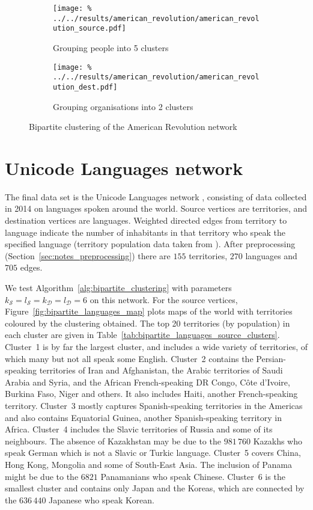 \documentclass[12pt]{ociamthesis}
\theoremstyle{plain}
\theoremstyle{definition}
\theoremstyle{remark}
\newcommand\ca[1]{\mathcal{#1}}
\begin{document}
\begin{figure}[H]
  \begin{subfigure}{.49\textwidth}
    \centering
    \texttt{[image: \%
    ../../results/american\_revolution/american\_revolution\_source.pdf]}
    \caption{Grouping people into 5 clusters}
    \label{fig:bipartite_revolution_source}
  \end{subfigure}
  \begin{subfigure}{.49\textwidth}
    \centering
    \texttt{[image: \%
    ../../results/american\_revolution/american\_revolution\_dest.pdf]}
    \caption{Grouping organisations into 2 clusters}
    \label{fig:bipartite_revolution_dest}
  \end{subfigure}
  \caption{Bipartite clustering of the American Revolution network}
  \label{fig:bipartite_revolution}
\end{figure}

\section{Unicode Languages network} \label{sec:bipartite_languages}

The final data set is the Unicode Languages network \cite{konect:unicodelang},
consisting of data collected in 2014 on languages spoken around the world.
Source vertices are territories, and destination vertices are languages.
Weighted directed edges from territory to language indicate the number of
inhabitants in that territory who speak the specified language (territory
population data taken from \cite{geonames}).
After preprocessing (Section~\ref{sec:notes_preprocessing}) there are $155$
territories, $270$ languages and $705$ edges.

We test Algorithm~\ref{alg:bipartite_clustering} with parameters $k_\ca{S} =
l_\ca{S} = k_\ca{D} = l_\ca{D} = 6$ on this network.
For the source vertices, Figure~\ref{fig:bipartite_languages_map} plots maps of
the world with territories coloured by the clustering obtained. The top 20
territories (by population) in each cluster are given in
Table~\ref{tab:bipartite_languages_source_clusters}.
Cluster~1 is by far the largest cluster, and includes a wide variety of
territories, of which many but not all speak some English.
Cluster~2 contains the Persian-speaking territories of Iran and Afghanistan,
the Arabic territories of Saudi Arabia and Syria, and the African
French-speaking DR Congo, C\^ote d'Ivoire, Burkina Faso, Niger and others. It
also includes Haiti, another French-speaking territory.
Cluster~3 mostly captures Spanish-speaking territories in the Americas and also
contains Equatorial Guinea, another Spanish-speaking territory in Africa.
Cluster~4 includes the Slavic territories of Russia and some of its neighbours.
The absence of Kazakhstan may be due to the $981 \, 760$ Kazakhs who speak
German which is not a Slavic or Turkic language.
Cluster~5 covers China, Hong Kong, Mongolia and some of South-East Asia. The
inclusion of Panama might be due to the $6821$ Panamanians who speak Chinese.
Cluster~6 is the smallest cluster and contains only Japan and the Koreas, which
are connected by the $636 \, 440$ Japanese who speak Korean.
\end{document}
